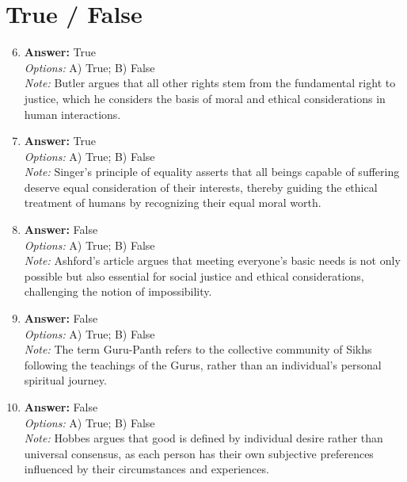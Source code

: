 \documentclass[12pt]{article}
\begin{document}
\section*{True / False}
\begin{enumerate}[label=\arabic*.]
\setcounter{enumi}{5}
\item \textbf{Answer:} True
\\ \textit{Options:} A) True; B) False
\\ \textit{Note:} Butler argues that all other rights stem from the fundamental right to justice, which he considers the basis of moral and ethical considerations in human interactions.
\item \textbf{Answer:} True
\\ \textit{Options:} A) True; B) False
\\ \textit{Note:} Singer's principle of equality asserts that all beings capable of suffering deserve equal consideration of their interests, thereby guiding the ethical treatment of humans by recognizing their equal moral worth.
\item \textbf{Answer:} False
\\ \textit{Options:} A) True; B) False
\\ \textit{Note:} Ashford's article argues that meeting everyone's basic needs is not only possible but also essential for social justice and ethical considerations, challenging the notion of impossibility.
\item \textbf{Answer:} False
\\ \textit{Options:} A) True; B) False
\\ \textit{Note:} The term Guru-Panth refers to the collective community of Sikhs following the teachings of the Gurus, rather than an individual's personal spiritual journey.
\item \textbf{Answer:} False
\\ \textit{Options:} A) True; B) False
\\ \textit{Note:} Hobbes argues that good is defined by individual desire rather than universal consensus, as each person has their own subjective preferences influenced by their circumstances and experiences.
\end{enumerate}
\end{document}
